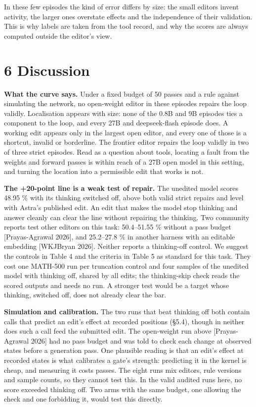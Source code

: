 \documentclass[
  10pt,
]{article}
\newcounter{none} %
\begin{document}
In these few episodes the kind of error differs by size: the small
editors invent activity, the larger ones overstate effects and the
independence of their validation. This is why labels are taken from the
tool record, and why the scores are always computed outside the editor's
view.

\section{6 Discussion}\label{discussion}

\textbf{What the curve says.} Under a fixed budget of 50 passes and a
rule against simulating the network, no open-weight editor in these
episodes repairs the loop validly. Localisation appears with size: none
of the 0.8B and 9B episodes ties a component to the loop, and every 27B
and deepseek-flash episode does. A working edit appears only in the
largest open editor, and every one of those is a shortcut, invalid or
borderline. The frontier editor repairs the loop validly in two of three
strict episodes. Read as a question about tools, locating a fault from
the weights and forward passes is within reach of a 27B open model in
this setting, and turning the location into a permissible edit that
works is not.

\textbf{The +20-point line is a weak test of repair.} The unedited model
scores 48.95 \% with its thinking switched off, above both valid strict
repairs and level with Astra's published edit. An edit that makes the
model stop thinking and answer cleanly can clear the line without
repairing the thinking. Two community reports test other editors on this
task: 50.4--51.55 \% without a pass budget {[}Prayas-Agrawal 2026{]},
and 25.2--27.8 \% in another harness with an editable embedding
{[}WKJBryan 2026{]}. Neither reports a thinking-off control. We suggest
the controls in Table 4 and the criteria in Table 5 as standard for this
task. They cost one MATH-500 run per truncation control and four samples
of the unedited model with thinking off, shared by all edits; the
thinking-skip check reads the scored outputs and needs no run. A
stronger test would be a target whose thinking, switched off, does not
already clear the bar.

\textbf{Simulation and calibration.} The two runs that beat thinking off
both contain calls that predict an edit's effect at recorded positions
(\S{}5.4), though in neither does such a call feed the submitted edit. The
open-weight run above {[}Prayas-Agrawal 2026{]} had no pass budget and
was told to check each change at observed states before a generation
pass. One plausible reading is that an edit's effect at recorded states
is what calibrates a gate's strength: predicting it in the kernel is
cheap, and measuring it costs passes. The eight runs mix editors, rule
versions and sample counts, so they cannot test this. In the valid
audited runs here, no score exceeded thinking off. Two arms with the
same budget, one allowing the check and one forbidding it, would test
this directly.
\end{document}
